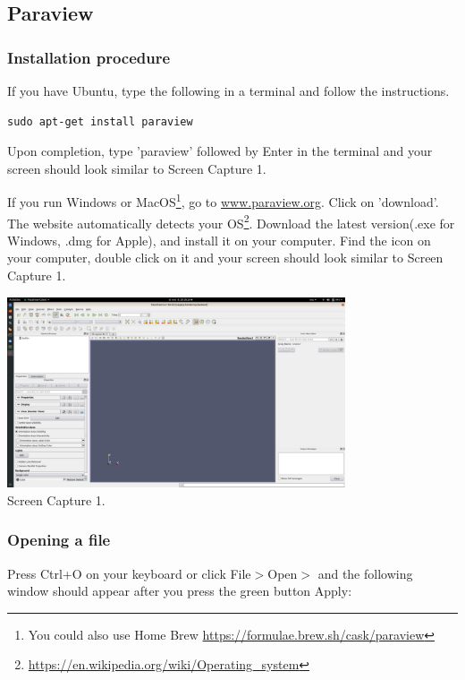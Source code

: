 \subsection{Paraview}

\subsubsection*{Installation procedure}

If you have Ubuntu, type the following in a terminal and follow the instructions. 
\begin{verbatim}
sudo apt-get install paraview
\end{verbatim}
Upon completion, type 'paraview' followed by Enter in the terminal and your screen should look similar to Screen Capture 1.

If you run Windows or MacOS\footnote{You could also use Home Brew 
\url{https://formulae.brew.sh/cask/paraview}}, go to \url{www.paraview.org}. 
Click on 'download'. The website automatically detects your 
OS\footnote{\url{https://en.wikipedia.org/wiki/Operating_system}}. 
Download the latest version(.exe for Windows, .dmg for Apple), and install it on your computer. 
Find the icon on your computer, double click on it and your screen should look similar to Screen Capture 1.

\begin{center}
\includegraphics[width=10cm]{images/paraview/p1}\\
{\captionfont Screen Capture 1.}
\end{center}

\subsubsection*{Opening a file}

Press Ctrl+O on your keyboard or click File$>$Open$>$ and the following window should appear after you press the 
green button Apply:

